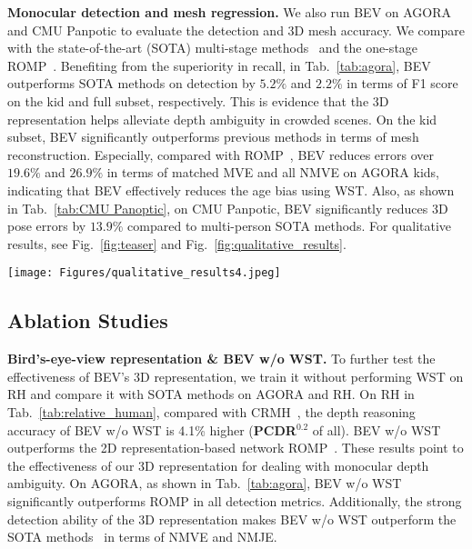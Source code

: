\documentclass[10pt,twocolumn,letterpaper]{article}
\begin{document}
\textbf{Monocular detection and mesh regression.}
We also run BEV on AGORA and CMU Panpotic to evaluate the detection and 3D mesh accuracy.
We compare with the state-of-the-art (SOTA) multi-stage methods~\cite{zanfir2018deep,zanfir2018monocular,jiang2020coherent,kocabas2021pare,Kocabas_SPEC_2021,patel2021agora,choi20223dcrowdnet} and the one-stage ROMP~\cite{romp}.
Benefiting from the superiority in recall, in Tab.~\ref{tab:agora}, BEV outperforms SOTA methods on detection by $5.2\%$ and $2.2\%$ in terms of F1 score on the kid and full subset, respectively.
This is evidence that the 3D representation helps alleviate depth ambiguity in crowded scenes.
On the kid subset, BEV significantly outperforms previous methods in terms of mesh reconstruction.
Especially, compared with ROMP~\cite{romp}, BEV reduces errors over $19.6\%$ and $26.9\%$ in terms of matched MVE and all NMVE on AGORA kids, indicating that BEV effectively reduces the age bias using WST.
Also, as shown in Tab.~\ref{tab:CMU Panoptic}, on CMU Panpotic, BEV significantly reduces 3D pose errors by $13.9\%$ compared to multi-person SOTA methods.
For qualitative results, see Fig.~\ref{fig:teaser} and
Fig.~\ref{fig:qualitative_results}.

\begin{figure*}[t]
	\centerline{	\texttt{[image: Figures/qualitative\_results4.jpeg]}}
	\vspace{-0.1in}
	\caption{Qualitative results on AGORA, RH, and Internet images~\cite{pexels}. Note how children and adults are properly placed in depth.}\vspace{-1mm}
	\label{fig:qualitative_results}
\end{figure*}

\subsection{Ablation Studies}





\textbf{Bird's-eye-view representation \&\/ BEV w/o WST.}
To further test the effectiveness of BEV's 3D representation, we train it without performing WST on RH and compare it with SOTA methods on AGORA and RH.
On RH in Tab.~\ref{tab:relative_human}, compared with CRMH~\cite{jiang2020coherent}, the depth reasoning accuracy of BEV w/o WST is 4.1\% higher (\textbf{PCDR$^{0.2}$} of all).
BEV w/o WST outperforms the 2D representation-based network ROMP~\cite{romp}.
These results point to the effectiveness of our 3D representation for dealing with monocular depth ambiguity.
On AGORA, as shown in Tab.~\ref{tab:agora}, BEV w/o WST significantly outperforms ROMP in all detection metrics.
Additionally, the strong detection ability of the 3D representation makes BEV w/o WST outperform the SOTA methods~\cite{romp,Kocabas_SPEC_2021,patel2021agora} in terms of NMVE and NMJE. 
\end{document}
